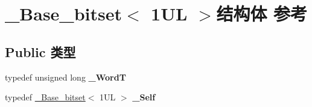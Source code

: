\hypertarget{struct___base__bitset_3_011_u_l_01_4}{}\section{\+\_\+\+Base\+\_\+bitset$<$ 1\+UL $>$结构体 参考}
\label{struct___base__bitset_3_011_u_l_01_4}
\subsection*{Public 类型}
\begin{DoxyCompactItemize}
\item 
\mbox{\label{struct___base__bitset_3_011_u_l_01_4_aeb4f5b82b7f79015ced73273b9ee6cbb}} 
typedef unsigned long {\bfseries \+\_\+\+WordT}
\item 
\mbox{\label{struct___base__bitset_3_011_u_l_01_4_a2420c60af288ee6ce590adf63be9ceaf}} 
typedef \hyperlink{struct___base__bitset}{\+\_\+\+Base\+\_\+bitset}$<$ 1\+U\+L $>$ {\bfseries \+\_\+\+Self}
\end{DoxyCompactItemize}
